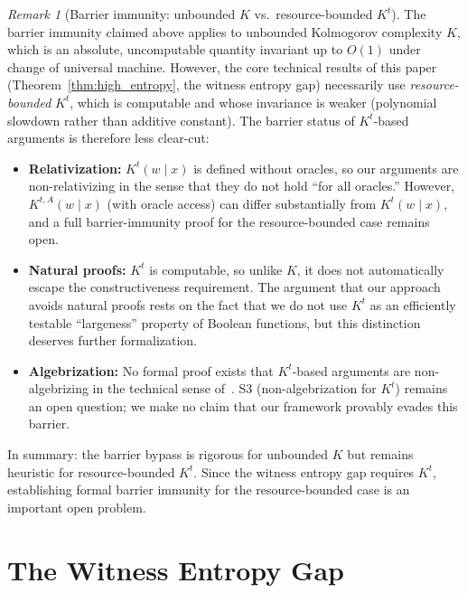 \documentclass[aps,prd,twocolumn,superscriptaddress,nofootinbib]{revtex4-2}
\theoremstyle{definition}
\theoremstyle{remark}
\newtheorem{remark}[theorem]{Remark}
\begin{document}
\begin{remark}[Barrier immunity: unbounded $K$ vs.\ resource-bounded $K^t$]
\label{rem:barrier-K-vs-Kt}
The barrier immunity claimed above applies to unbounded Kolmogorov complexity $K$, which is an absolute, uncomputable quantity invariant up to $O(1)$ under change of universal machine. However, the core technical results of this paper (Theorem~\ref{thm:high_entropy}, the witness entropy gap) necessarily use \emph{resource-bounded} $K^t$, which is computable and whose invariance is weaker (polynomial slowdown rather than additive constant). The barrier status of $K^t$-based arguments is therefore less clear-cut:
\begin{itemize}
\item \textbf{Relativization:} $K^t(w \mid x)$ is defined without oracles, so our arguments are non-relativizing in the sense that they do not hold ``for all oracles.'' However, $K^{t,A}(w \mid x)$ (with oracle access) can differ substantially from $K^t(w \mid x)$, and a full barrier-immunity proof for the resource-bounded case remains open.
\item \textbf{Natural proofs:} $K^t$ is computable, so unlike $K$, it does not automatically escape the constructiveness requirement. The argument that our approach avoids natural proofs rests on the fact that we do not use $K^t$ as an efficiently testable ``largeness'' property of Boolean functions, but this distinction deserves further formalization.
\item \textbf{Algebrization:} No formal proof exists that $K^t$-based arguments are non-algebrizing in the technical sense of~\cite{AaronsonWigderson2009}. S3 (non-algebrization for $K^t$) remains an open question; we make no claim that our framework provably evades this barrier.
\end{itemize}
In summary: the barrier bypass is rigorous for unbounded $K$ but remains heuristic for resource-bounded $K^t$. Since the witness entropy gap requires $K^t$, establishing formal barrier immunity for the resource-bounded case is an important open problem.
\end{remark}


\section{The Witness Entropy Gap}
\label{sec:gap}
\end{document}
